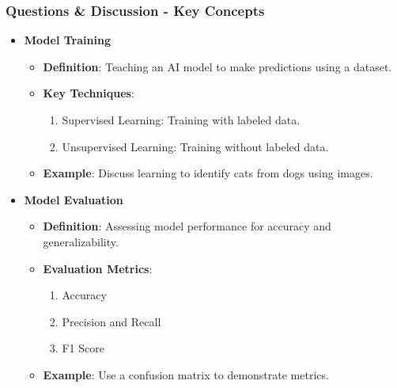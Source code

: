 \documentclass[aspectratio=169]{beamer}
\begin{document}
\begin{frame}[fragile]
    \frametitle{Questions \& Discussion - Key Concepts}
    \begin{itemize}
        \item \textbf{Model Training}
            \begin{itemize}
                \item \textbf{Definition}: Teaching an AI model to make predictions using a dataset.
                \item \textbf{Key Techniques}:
                    \begin{enumerate}
                        \item Supervised Learning: Training with labeled data.
                        \item Unsupervised Learning: Training without labeled data.
                    \end{enumerate}
                \item \textbf{Example}: Discuss learning to identify cats from dogs using images.
            \end{itemize}
        
        \item \textbf{Model Evaluation}
            \begin{itemize}
                \item \textbf{Definition}: Assessing model performance for accuracy and generalizability.
                \item \textbf{Evaluation Metrics}:
                    \begin{enumerate}
                        \item Accuracy
                        \item Precision and Recall
                        \item F1 Score
                    \end{enumerate}
                \item \textbf{Example}: Use a confusion matrix to demonstrate metrics.
            \end{itemize}
    \end{itemize}
\end{frame}
\end{document}
